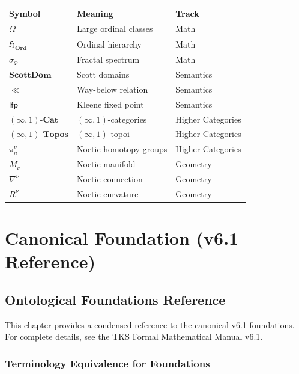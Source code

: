 \documentclass[11pt,twoside,openright]{book}
\theoremstyle{definition}
\theoremstyle{plain}
\theoremstyle{remark}
\newcommand{\Ord}{\mathbf{Ord}}
\newcommand{\infobox}[2]{%
\begin{tcolorbox}[colback=gray!10!white,colframe=gray!75!black,title=\textbf{#1}]
#2
\end{tcolorbox}
}
\begin{document}
\begin{table}[H]
\centering
\begin{tabular}{lll}
\toprule
\textbf{Symbol} & \textbf{Meaning} & \textbf{Track} \\
\midrule
$\Omega$ & Large ordinal classes & Math \\
$\mathfrak{H}_{\Ord}$ & Ordinal hierarchy & Math \\
$\sigma_\Phi$ & Fractal spectrum & Math \\
$\mathbf{ScottDom}$ & Scott domains & Semantics \\
$\ll$ & Way-below relation & Semantics \\
$\mathsf{lfp}$ & Kleene fixed point & Semantics \\
$(\infty,1)\text{-}\mathbf{Cat}$ & $(\infty,1)$-categories & Higher Categories \\
$(\infty,1)\text{-}\mathbf{Topos}$ & $(\infty,1)$-topoi & Higher Categories \\
$\pi_n^\nu$ & Noetic homotopy groups & Higher Categories \\
$M_\nu$ & Noetic manifold & Geometry \\
$\nabla^\nu$ & Noetic connection & Geometry \\
$R^\nu$ & Noetic curvature & Geometry \\
\bottomrule
\end{tabular}
\end{table}

\tableofcontents

\mainmatter

\part{Canonical Foundation (v6.1 Reference)}
\label{part:v61-reference}

\chapter{Ontological Foundations Reference}
\label{ch:foundations-reference}

\infobox{Reference Chapter}{
This chapter provides a condensed reference to the canonical v6.1 foundations. For complete details, see the TKS Formal Mathematical Manual v6.1.
}

\section{Terminology Equivalence for Foundations}
\label{sec:foundation-terminology}
\end{document}
